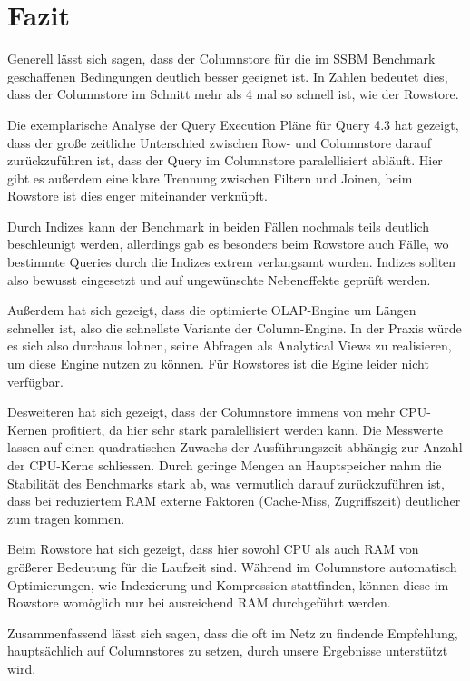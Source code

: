 \chapter{Fazit}\label{chapter:fazit}
Generell lässt sich sagen, dass der Columnstore für die im SSBM Benchmark geschaffenen Bedingungen deutlich besser geeignet ist.
 In Zahlen bedeutet dies, dass der Columnstore im Schnitt mehr als 4 mal so schnell ist, wie der Rowstore.

Die exemplarische Analyse der Query Execution Pläne für Query 4.3 hat gezeigt, dass der große zeitliche Unterschied zwischen Row- und 
Columnstore darauf zurückzuführen ist, dass der Query im Columnstore paralellisiert abläuft.
Hier gibt es außerdem eine klare Trennung zwischen Filtern und Joinen, beim Rowstore ist dies enger miteinander verknüpft. 


Durch Indizes kann der Benchmark in beiden Fällen nochmals teils deutlich beschleunigt werden, allerdings gab es besonders beim Rowstore auch Fälle, 
wo bestimmte Queries durch die Indizes extrem verlangsamt wurden. Indizes sollten also bewusst eingesetzt und auf ungewünschte Nebeneffekte geprüft werden.

Außerdem hat sich gezeigt, dass die optimierte OLAP-Engine um Längen schneller ist, also die schnellste Variante der Column-Engine. In der Praxis
würde es sich also durchaus lohnen, seine Abfragen als Analytical Views zu realisieren, um diese Engine nutzen zu können. Für Rowstores ist die Egine leider nicht verfügbar.

Desweiteren hat sich gezeigt, dass der Columnstore immens von mehr CPU-Kernen profitiert, da hier sehr stark paralellisiert werden kann. 
Die Messwerte lassen auf einen quadratischen Zuwachs der Ausführungszeit abhängig zur Anzahl der CPU-Kerne schliessen. Durch geringe Mengen an 
Hauptspeicher nahm die Stabilität des Benchmarks stark ab, was vermutlich darauf zurückzuführen ist, dass bei reduziertem RAM externe Faktoren (Cache-Miss, Zugriffszeit) deutlicher zum tragen kommen. 

Beim Rowstore hat sich gezeigt, dass hier sowohl CPU als auch RAM von größerer Bedeutung für die Laufzeit sind. 
Während im Columnstore automatisch Optimierungen, wie Indexierung und Kompression stattfinden, können diese im Rowstore womöglich nur bei ausreichend RAM durchgeführt werden. 

Zusammenfassend lässt sich sagen, dass die oft im Netz zu findende Empfehlung, hauptsächlich auf Columnstores zu setzen, durch unsere Ergebnisse unterstützt wird.

